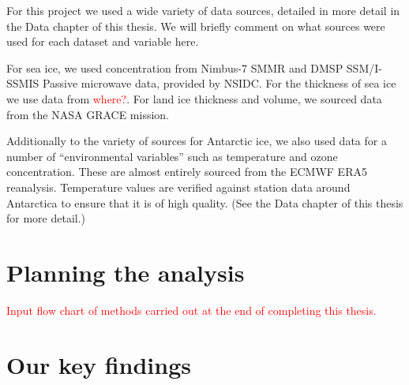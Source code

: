 \documentclass[../main.tex]{subfiles}
\begin{document}
For this project we used a wide variety of data sources, detailed in more detail in the Data chapter of this thesis. We will briefly comment on what sources were used for each dataset and variable here.

For sea ice, we used concentration from Nimbus-7 SMMR and DMSP SSM/I-SSMIS Passive microwave data, provided by NSIDC. For the thickness of sea ice we use data from \textcolor{red}{where?}. For land ice thickness and volume, we sourced data from the NASA GRACE mission. 

Additionally to the variety of sources for Antarctic ice, we also used data for a number of ``environmental variables'' such as temperature and ozone concentration. These are almost entirely sourced from the ECMWF ERA5 reanalysis. Temperature values are verified against station data around Antarctica to ensure that it is of high quality. (See the Data chapter of this thesis for more detail.)

\section{Planning the analysis}
\textcolor{red}{Input flow chart of methods carried out at the end of completing this thesis.}

\section{Our key findings}
\end{document}
